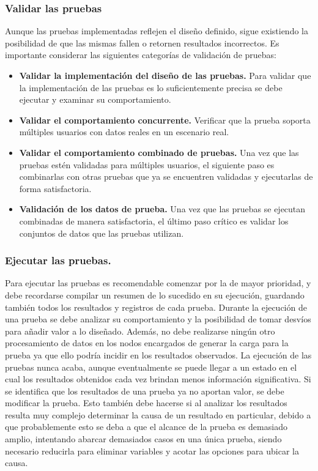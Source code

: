 \subsubsection{Validar las pruebas}
Aunque las pruebas implementadas reflejen el diseño definido, sigue existiendo la posibilidad de que las mismas fallen o retornen resultados incorrectos.
Es importante considerar las siguientes categorías de validación de pruebas:
\begin{itemize}
	\item
	\textbf{Validar la implementación del diseño de las pruebas.} Para validar que la implementación de las pruebas es lo suficientemente precisa se debe ejecutar y examinar su
	comportamiento.
	\item
	\textbf{Validar el comportamiento concurrente.} Verificar que la prueba soporta múltiples usuarios con datos reales en un escenario real.
	\item
	\textbf{Validar el comportamiento combinado de pruebas.} Una vez que las pruebas estén validadas para múltiples usuarios, el siguiente paso es combinarlas con otras pruebas que ya se encuentren
	validadas y ejecutarlas de forma satisfactoria.
	\item
	\textbf{Validación de los datos de prueba.} Una vez que las pruebas se ejecutan combinadas de manera satisfactoria, el último paso crítico es validar los conjuntos de datos que
	las pruebas utilizan.
\end{itemize}

\subsubsection{Ejecutar las pruebas.}
Para ejecutar las pruebas es recomendable comenzar por la de mayor prioridad, y debe recordarse compilar un resumen de lo sucedido en su ejecución, guardando también todos los resultados y registros de cada prueba.
Durante la ejecución de una prueba se debe analizar su comportamiento y la posibilidad de tomar desvíos para añadir valor a lo diseñado. Además, no debe realizarse ningún otro procesamiento de datos en los nodos encargados de generar la carga para la prueba ya que ello podría incidir en los resultados observados.
	La ejecución de las pruebas nunca acaba, aunque eventualmente se puede llegar a un estado en el cual los resultados obtenidos cada vez brindan menos información significativa. Si se identifica que los resultados de una prueba ya no aportan valor, se debe modificar la prueba. Esto también debe hacerse si al analizar los resultados resulta muy complejo determinar la causa de un resultado en particular, debido a que probablemente esto se deba a que el alcance de la prueba es demasiado amplio, intentando abarcar demasiados casos en una única prueba, siendo necesario reducirla para eliminar variables y acotar las opciones para ubicar la causa.

